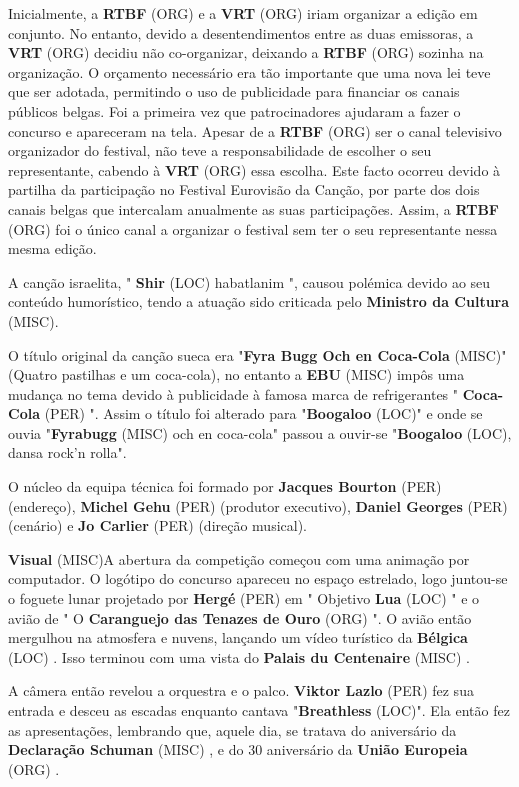 \documentclass[12pt,a4paper]{article}
\begin{document}
Inicialmente, a \textbf{RTBF} (ORG) e a \textbf{VRT} (ORG) iriam organizar a edição em conjunto. No entanto, devido a desentendimentos entre as duas emissoras, a \textbf{VRT} (ORG) decidiu não co-organizar, deixando a \textbf{RTBF} (ORG) sozinha na organização. O orçamento necessário era tão importante que uma nova lei teve que ser adotada, permitindo o uso de publicidade para financiar os canais públicos belgas. Foi a primeira vez que patrocinadores ajudaram a fazer o concurso e apareceram na tela. Apesar de a \textbf{RTBF} (ORG) ser o canal televisivo organizador do festival, não teve a responsabilidade de escolher o seu representante, cabendo à \textbf{VRT} (ORG) essa escolha. Este facto ocorreu devido à partilha da participação no Festival Eurovisão da Canção, por parte dos dois canais belgas que intercalam anualmente as suas participações. Assim, a \textbf{RTBF} (ORG) foi o único canal a organizar o festival sem ter o seu representante nessa mesma edição.

A canção israelita, " \textbf{Shir} (LOC) habatlanim ", causou polémica devido ao seu conteúdo humorístico, tendo a atuação sido criticada pelo \textbf{Ministro da Cultura} (MISC).

O título original da canção sueca era "\textbf{Fyra Bugg Och en Coca-Cola} (MISC)" (Quatro pastilhas e um coca-cola), no entanto a \textbf{EBU} (MISC) impôs uma mudança no tema devido à publicidade à famosa marca de refrigerantes " \textbf{Coca-Cola} (PER) ". Assim o título foi alterado para "\textbf{Boogaloo} (LOC)" e onde se ouvia "\textbf{Fyrabugg} (MISC) och en coca-cola" passou a ouvir-se "\textbf{Boogaloo} (LOC), dansa rock'n rolla".

O núcleo da equipa técnica foi formado por \textbf{Jacques Bourton} (PER) (endereço), \textbf{Michel Gehu} (PER) (produtor executivo), \textbf{Daniel Georges} (PER) (cenário) e \textbf{Jo Carlier} (PER) (direção musical).



\textbf{Visual} (MISC)A abertura da competição começou com uma animação por computador. O logótipo do concurso apareceu no espaço estrelado, logo juntou-se o foguete lunar projetado por \textbf{Hergé} (PER) em " Objetivo \textbf{Lua} (LOC) " e o avião de " O \textbf{Caranguejo das Tenazes de Ouro} (ORG) ". O avião então mergulhou na atmosfera e nuvens, lançando um vídeo turístico da \textbf{Bélgica} (LOC) . Isso terminou com uma vista do \textbf{Palais du Centenaire} (MISC) .

A câmera então revelou a orquestra e o palco. \textbf{Viktor Lazlo} (PER) fez sua entrada e desceu as escadas enquanto cantava "\textbf{Breathless} (LOC)". Ela então fez as apresentações, lembrando que, aquele dia, se tratava do aniversário da \textbf{Declaração Schuman} (MISC) , e do 30 aniversário da \textbf{União Europeia} (ORG) .
\end{document}
